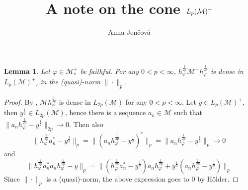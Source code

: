 \documentclass[12pt]{article}
\title{A note on the cone $L_p(\Me)^+$}
\author{Anna Jen\v cov\'a}
\newtheorem{lemma}{Lemma}
\theoremstyle{definition}
\theoremstyle{remark}
\def\Me{\mathcal M}
\begin{document}
\maketitle

\begin{lemma} Let $\varphi\in \Me_*^+$ be faithful. For any $0<p<\infty$, $h_\varphi^{\frac1{2p}}\Me^+h_\varphi^{\frac1{2p}}$ is dense in $L_p(\Me)^+$, in the (quasi)-norm $\|\cdot\|_p$.

\end{lemma}

\begin{proof} By \cite[Lemma 1.1]{junge2003noncommutative}, $\Me
h_\varphi^{\frac1{2p}}$ is dense in $L_{2p}(\Me)$ for any $0<p<\infty$. Let $y\in L_p(\Me)^+$, then
$y^{\frac12}\in L_{2p}(\Me)$, hence there is a sequence $a_n\in \Me$ such that
$\|a_nh^{\frac1{2p}}_\varphi-y^{\frac12}\|_{2p}\to 0$. Then also 
\[
\|h^{\frac1{2p}}_\varphi
a_n^*-y^{\frac12}\|_p=\|(a_nh^{\frac1{2p}}_\varphi-y^{\frac12})^*\|_p=\|a_nh^{\frac1{2p}}_\varphi-y^{\frac12}\|_p\to 0
\]
and 
\[
\|h^{\frac1{2p}}_\varphi a_n^*a_nh^{\frac1{2p}}_\varphi-y\|_p=\|(h^{\frac1{2p}}_\varphi
a_n^*-y^{\frac12})a_nh^{\frac1{2p}}_\varphi+y^{\frac12}(a_nh^{\frac1{2p}}_\varphi-y^{\frac12})\|_p
\]
Since $\|\cdot\|_p$ is a (quasi)-norm, the above expression goes to 0 by H\"older.


\end{proof}
\end{document}
